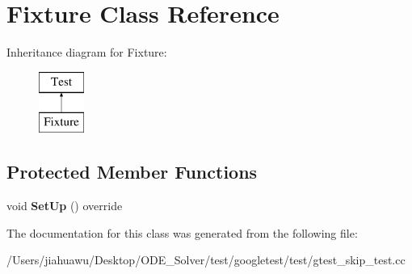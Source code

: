 \hypertarget{class_fixture}{}\section{Fixture Class Reference}
\label{class_fixture}
Inheritance diagram for Fixture\+:\begin{figure}[H]
\begin{center}
\leavevmode
\includegraphics[height=2.000000cm]{class_fixture}
\end{center}
\end{figure}
\subsection*{Protected Member Functions}
\begin{DoxyCompactItemize}
\item 
\mbox{\label{class_fixture_ad43066dc2f6aab4c4b4f0913e92f01f8}} 
void {\bfseries Set\+Up} () override
\end{DoxyCompactItemize}


The documentation for this class was generated from the following file\+:\begin{DoxyCompactItemize}
\item 
/\+Users/jiahuawu/\+Desktop/\+O\+D\+E\+\_\+\+Solver/test/googletest/test/gtest\+\_\+skip\+\_\+test.\+cc\end{DoxyCompactItemize}

